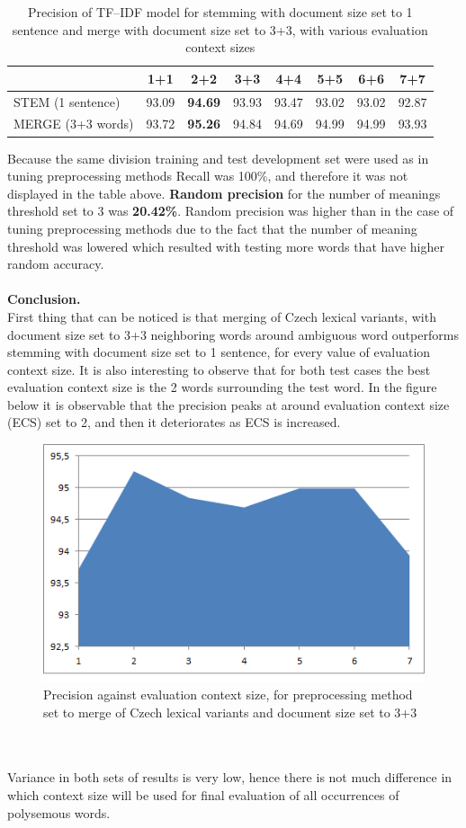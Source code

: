 \begin{table}[h!]
\begin{tabular}{ l | c c c c c c c}
    &  1+1 & 2+2 & 3+3 & 4+4 & 5+5 & 6+6 & 7+7 \\
\hline
STEM (1 sentence)  & 93.09 & \textbf{94.69} & 93.93 & 93.47 & 93.02 & 93.02 & 92.87 \\
MERGE (3+3 words) & 93.72 & \textbf{95.26} & 94.84 & 94.69 & 94.99 & 94.99 & 93.93 \\
\end{tabular}
\caption{Precision of TF--IDF model for stemming with document size set to 1 sentence and merge with document size set to 3+3, with various evaluation context sizes}
\end{table} 

Because the same division training and test development set were used as in tuning preprocessing methods Recall was 100\%, and therefore it was not displayed in the table above. 
\textbf{Random precision} for the number of meanings threshold set to 3 was \textbf{20.42\%}. Random precision was higher than in the case of tuning preprocessing methods due to the fact that the number of meaning threshold was lowered which resulted with testing more words that have higher random accuracy. 
\\\\
\textbf{Conclusion.}\\
First thing that can be noticed is that merging of Czech lexical variants, with document size set to 3+3 
neighboring words around ambiguous word outperforms stemming with document size set to 1 sentence, 
for every value of evaluation context size. It is also interesting to observe that for both test cases the best 
evaluation context size is the 2 words surrounding the test word. In the figure below it is observable that 
the precision peaks at around evaluation context size (ECS) set to 2, and then it deteriorates as ECS is increased.
\begin{figure}[h!]
\includegraphics{img/precision-evalContSize_merge.png}
\caption{Precision against evaluation context size, for preprocessing method set to merge of Czech lexical variants and document size set to 3+3}
\end{figure}
\\\\
 Variance in both sets of results 
is very low, hence there is not much difference in which context size will be used for final evaluation
of all occurrences of polysemous words.


